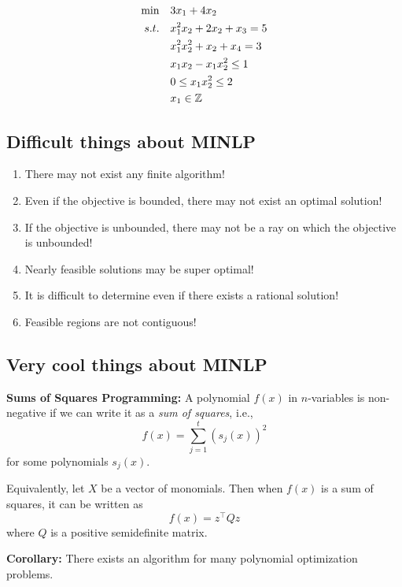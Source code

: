 \documentclass{article}
\begin{document}
\begin{equation}
\begin{split}
\min \quad & 3 x_1+4 x_2\\
s.t. \quad & x_1^2 x_2+2 x_2+x_3=5\\
&  x_1^2 x_2^2+x_2+x_4=3 \\
& x_1 x_2-x_1 x_2^2 \leq 1\\
  &0 \leq x_1 x_2^2 \leq 2\\
  &x_1 \in {\mathbb{Z}}
\end{split} 
\end{equation}

\subsection{Difficult things about MINLP}

\begin{enumerate}
\item There may not exist any finite algorithm!  
\item Even if the objective is bounded, there may not exist an optimal solution!
\item If the objective is unbounded, there may not be a ray on which the objective is unbounded!
\item Nearly feasible solutions may be super optimal!
\item It is difficult to determine even if there exists a rational solution!
\item Feasible regions are not contiguous!
\end{enumerate}


\newpage

\subsection{Very cool things about MINLP}

\textbf{Sums of Squares Programming:}  A polynomial $f(x)$ in $n$-variables is non-negative if we can write it as a \emph{sum of squares}, i.e., 
$$
f(x) = \sum_{j=1}^t (s_j(x))^2
$$
for some polynomials $s_j(x)$.  

Equivalently, let $X$ be a vector of monomials.  Then when $f(x)$ is a sum of squares, it can be written as 
$$
f(x) = z^\top Q z
$$
where $Q$ is a positive semidefinite matrix.

\medskip
\medskip
\noindent \textbf{Corollary:} There exists an algorithm for many polynomial optimization problems.
\end{document}

